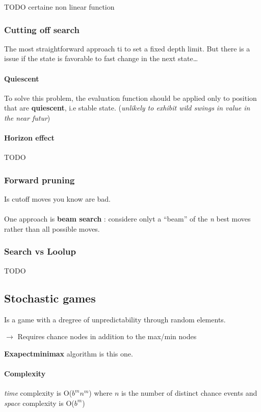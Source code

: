 TODO certaine non linear function

\subsubsection{Cutting off search}
The most straightforward approach ti to set a fixed depth limit.
But there is a issue if the state is favorable to fast change in the next
state\ldots 

\paragraph{Quiescent}  To solve  this problem,  the evaluation  function
should  be applied  only to  position that  are \textbf{quiescent},  i.e
stable state. (\textit{unlikely  to exhibit wild swings in  value in the
near futur})

\paragraph{Horizon effect} TODO

\subsubsection{Forward pruning}
Is cutoff moves you know are bad.

\paragraph{ } One approach is \textbf{beam search} : considere onlyt a ``beam'' of the 
\textit{n} best moves rather than all possible moves.


\subsubsection{Search vs Loolup}
TODO


\subsection{Stochastic games}
Is a game with a dregree of unpredictability through random elements.

$\rightarrow$ Requires chance nodes in addition to the max/min nodes

\textbf{Exapectminimax} algorithm is this one.

\paragraph{Complexity} \textit{time} complexity is O($b^m n^m$) where $n$
is the number of distinct chance events and \textit{space} complexity is O($b^m$)

